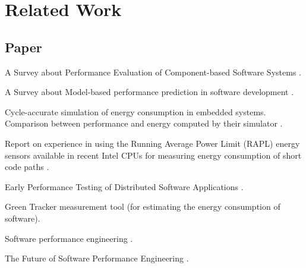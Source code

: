 
\chapter{Related Work}
\label{rel_work}

\section{Paper}

A Survey about Performance Evaluation of Component-based Software Systems \cite{koziolek2010performance}.

A Survey about Model-based performance prediction in software development \cite{balsamo2004model}.

Cycle-accurate simulation of energy consumption in embedded systems. Comparison between performance and energy computed by their simulator \cite{simunic1999cycle}.

Report on experience in using the Running Average Power Limit (RAPL) energy sensors available in recent Intel CPUs for measuring energy consumption
of short code paths \cite{hahnel2012measuring}.

Early Performance Testing of Distributed Software Applications \cite{denaro2004early}.

Green Tracker measurement tool (for estimating the
energy consumption of software)\cite{amsel2010green}.

Software performance engineering \cite{smith1993software}.

The Future of Software Performance Engineering \cite{woodside2007future}.


